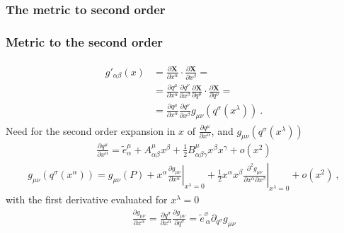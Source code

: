 \documentclass[letterpaper,10pt,english]{jupyterBook}
\begin{document}
\subsubsection{The metric to second order}
\label{\detokenize{ch/relativity-general/local-inertial-reference-frame-and-equivalence-principle:the-metric-to-second-order}}\subsubsection*{Metric to the second order}
\begin{equation*}
\begin{split}\begin{aligned}
  g'_{\alpha \beta}(x)
  & = \frac{\partial \mathbf{X}}{\partial x^\alpha} \cdot \frac{\partial \mathbf{X}}{\partial x^{\beta}} = \\
  & = \frac{\partial q^{\mu}}{\partial x^\alpha} \frac{\partial q^{\nu}}{\partial x^\beta} \frac{\partial \mathbf{X}}{\partial q^{\mu}} \cdot \frac{\partial \mathbf{X}}{\partial q^{\nu}} = \\
  & = \frac{\partial q^{\mu}}{\partial x^\alpha} \frac{\partial q^{\nu}}{\partial x^\beta} g_{\mu \nu}(q^\sigma(x^\lambda)) \ .
\end{aligned}\end{split}
\end{equation*}
\sphinxAtStartPar
Need for the second order expansion in \(x\) of \(\frac{\partial q^{\mu}}{\partial x^\alpha}\), and \(g_{\mu \nu}(q^\sigma(x^\lambda))\)
\begin{equation*}
\begin{split}\frac{\partial q^{\mu}}{\partial x^\alpha} = \widetilde{e}^{\mu}_{\alpha} + A^{\mu}_{\alpha \beta} x^{\beta} + \frac{1}{2} B^{\mu}_{\alpha \beta \gamma} x^{\beta} x^\gamma + o(x^2)\end{split}
\end{equation*}\begin{equation*}
\begin{split}g_{\mu \nu}(q^\sigma(x^\alpha)) = g_{\mu\nu}(P) + x^\alpha \left.\frac{\partial g_{\mu \nu}}{\partial x^\alpha}\right|_{x^\lambda = 0} + \frac{1}{2} x^\alpha x^\beta \left. \frac{\partial^2 g_{\mu \nu}}{\partial x^\alpha \partial x^\beta} \right|_{x^\lambda=0} + o(x^2) \ ,\end{split}
\end{equation*}
\sphinxAtStartPar
with the first derivative evaluated for \(x^\lambda = 0\)
\begin{equation*}
\begin{split}\frac{\partial g_{\mu \nu}}{\partial x^\alpha} = \frac{\partial q^{\sigma}}{\partial x^{\alpha}} \frac{\partial g_{\mu \nu}}{\partial q^{\sigma}}= \widetilde{e}^{\sigma}_{\ \alpha} \partial_{q^\sigma} g_{\mu \nu}\end{split}
\end{equation*}
\end{document}
